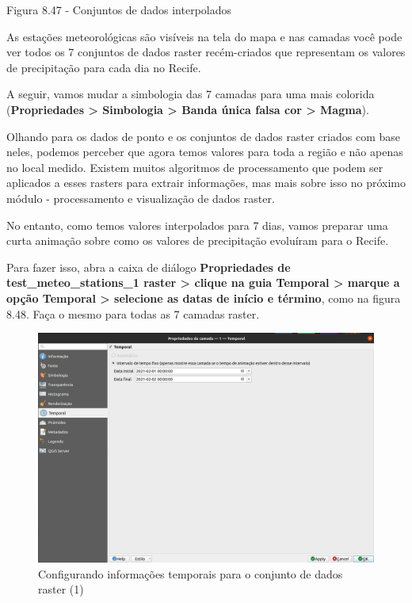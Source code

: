 \documentclass[
]{krantz}
\begin{document}
Figura 8.47 - Conjuntos de dados interpolados

As estações meteorológicas são visíveis na tela do mapa e nas camadas você pode ver todos os 7 conjuntos de dados raster recém-criados que representam os valores de precipitação para cada dia no Recife.

A seguir, vamos mudar a simbologia das 7 camadas para uma mais colorida (\textbf{Propriedades \textgreater{} Simbologia \textgreater{} Banda única falsa cor \textgreater{} Magma}).

Olhando para os dados de ponto e os conjuntos de dados raster criados com base neles, podemos perceber que agora temos valores para toda a região e não apenas no local medido. Existem muitos algoritmos de processamento que podem ser aplicados a esses rasters para extrair informações, mas mais sobre isso no próximo módulo - processamento e visualização de dados raster.

No entanto, como temos valores interpolados para 7 dias, vamos preparar uma curta animação sobre como os valores de precipitação evoluíram para o Recife.

Para fazer isso, abra a caixa de diálogo \textbf{Propriedades de test\_meteo\_stations\_1 raster \textgreater{} clique na guia Temporal \textgreater{} marque a opção Temporal \textgreater{} selecione as datas de início e término}, como na figura 8.48. Faça o mesmo para todas as 7 camadas raster.

\begin{figure}
\centering
\includegraphics{media/modulo8/fig848_a.png}
\caption{Configurando informações temporais para o conjunto de dados raster (1)}
\end{figure}
\end{document}

